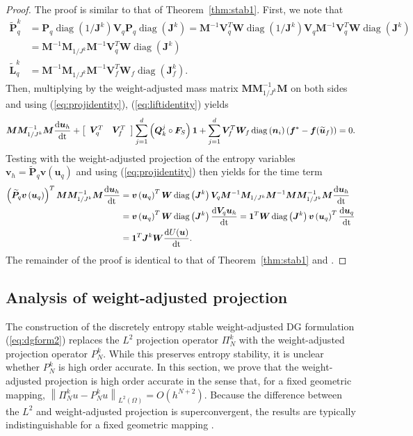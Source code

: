 \documentclass[preprint,10pt]{article}
\theoremstyle{definition}
\theoremstyle{lemma}
\theoremstyle{theorem}
\theoremstyle{assumption}
\DeclareMathOperator{\diag}{diag}
\renewcommand{\tilde}{\widetilde}
\newcommand{\td}[2]{\frac{{\rm d}#1}{{\rm d}{\rm #2}}}
\newcommand{\nor}[1]{\left\| #1 \right\|}
\newcommand{\LRp}[1]{\left( #1 \right)}
\newcommand{\LRs}[1]{\left[ #1 \right]}
\begin{document}
{\begin{proof}
The proof is similar to that of Theorem~\ref{thm:stab1}.  
First, we note that 
\begin{align}
\tilde{\bm{P}}^k_q &= \bm{P}_q \diag\LRp{{1}/{\bm{J}^k}} \bm{V}_q\bm{P}_q \diag\LRp{\bm{J}^k} = \bm{M}^{-1}\bm{V}_q^T\bm{W} \diag\LRp{{1}/{\bm{J}^k}} \bm{V}_q \bm{M}^{-1} \bm{V}_q^T \bm{W}\diag\LRp{\bm{J}^k} \nonumber\\
&= \bm{M}^{-1}\bm{M}_{1/J^k} \bm{M}^{-1} \bm{V}_q^T \bm{W}\diag\LRp{\bm{J}^k}\label{eq:projidentity}\\
\tilde{\bm{L}}^k_q &= \bm{M}^{-1}\bm{M}_{1/J^k} \bm{M}^{-1} \bm{V}_f^T \bm{W}_f\diag\LRp{\bm{J}^k_f} \label{eq:liftidentity}.
\end{align}
Then, multiplying by the weight-adjusted mass matrix $\bm{M}\bm{M}_{1/J^k}^{-1}\bm{M}$ on both sides and using (\ref{eq:projidentity}), (\ref{eq:liftidentity}) yields 
\[
\bm{M}\bm{M}_{1/J^k}^{-1}\bm{M}\td{\bm{u}_h}{t} + \LRs{\begin{array}{cc}{\bm{V}}_q^T & {\bm{V}}_f^T\end{array}}
\sum_{j=1}^d \LRp{\bm{Q}^j_k \circ \bm{F}_S}\bm{1} + \sum_{j=1}^d {\bm{V}}_f^T\bm{W}_f \diag\LRp{\bm{n}_i}\LRp{\bm{f}^* - \bm{f}(\tilde{\bm{u}}_f)} = 0.
\]
Testing with the weight-adjusted projection of the entropy variables $\bm{v}_h = \tilde{\bm{P}}_q \bm{v}\LRp{\bm{u}_q}$ and using (\ref{eq:projidentity}) then yields for the time term
\begin{align*}
\LRp{\tilde{\bm{P}}_q \bm{v}\LRp{\bm{u}_q}}^T\bm{M}\bm{M}_{1/J^k}^{-1}\bm{M}\td{\bm{u}_h}{t} &= \bm{v}\LRp{\bm{u}_q}^T\bm{W}\diag\LRp{\bm{J}^k}\bm{V}_q \bm{M}^{-1}\bm{M}_{1/J^k} \bm{M}^{-1} \bm{M}\bm{M}_{1/J^k}^{-1}\bm{M}\td{\bm{u}_h}{t}\\
&= \bm{v}\LRp{\bm{u}_q}^T\bm{W}\diag\LRp{\bm{J}^k} \td{\bm{V}_q\bm{u}_h}{t} = \bm{1}^T\bm{W}\diag\LRp{\bm{J}^k} \bm{v}\LRp{\bm{u}_q}^T\td{\bm{u}_q}{t} \\
&= \bm{1}^T\bm{J}^k\bm{W}\td{U(\bm{u})}{t}.
\end{align*}
The remainder of the proof is identical to that of Theorem~\ref{thm:stab1} and \cite{chan2017discretely}.
\end{proof}

\subsection{Analysis of weight-adjusted projection} 

The construction of the discretely entropy stable weight-adjusted DG formulation (\ref{eq:dgform2}) replaces the $L^2$ projection operator $\Pi_N^k$ with the weight-adjusted projection operator $P^k_N$.  While this preserves entropy stability, it is unclear whether $P^k_N$ is high order accurate.  In this section, we prove that the weight-adjusted projection is high order accurate in the sense that, for a fixed geometric mapping, $\nor{\Pi_N^k u - P_N^k  u}_{L^2\LRp{\Omega}} = O(h^{N+2})$.  Because the difference between the $L^2$ and weight-adjusted projection is superconvergent, the results are typically indistinguishable for a fixed geometric mapping \cite{chan2018multi}.  

}
\end{document}
